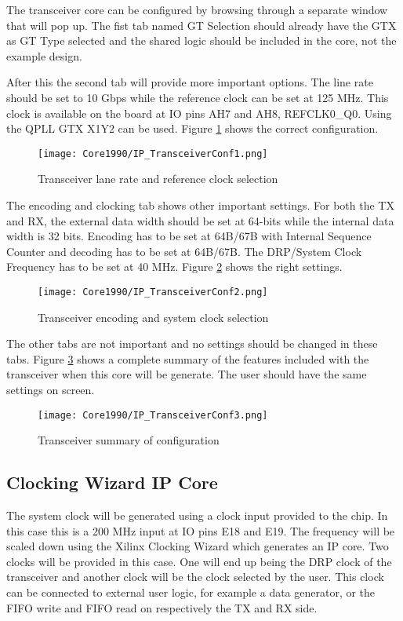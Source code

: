 	The transceiver core can be configured by browsing through a separate window that will pop up. The fist tab named GT Selection should already have the GTX as GT Type selected and the shared logic should be included in the core, not the example design.
	
	After this the second tab will provide more important options. The line rate should be set to 10 Gbps while the reference clock can be set at 125 MHz. This clock is available on the board at IO pins AH7 and AH8, REFCLK0\_Q0. Using the QPLL GTX X1Y2 can be used. Figure \ref{fig:IP_TransceiverConf1} shows the correct configuration.
	
	\begin{figure}[H]
		\centering
		\texttt{[image: Core1990/IP\_TransceiverConf1.png]}	
		\caption{Transceiver lane rate and reference clock selection}
		\label{fig:IP_TransceiverConf1}
	\end{figure} 
	
	The encoding and clocking tab shows other important settings. For both the TX and RX, the external data width should be set at 64-bits while the internal data width is 32 bits. Encoding has to be set at 64B/67B with Internal Sequence Counter and decoding has to be set at 64B/67B. The DRP/System Clock Frequency has to be set at 40 MHz. Figure \ref{fig:IP_TransceiverConf2} shows the right settings.
	
	\begin{figure}[H]
		\centering
		\texttt{[image: Core1990/IP\_TransceiverConf2.png]}	
		\caption{Transceiver encoding and system clock selection}
		\label{fig:IP_TransceiverConf2}
	\end{figure} 
	
	The other tabs are not important and no settings should be changed in these tabs. Figure \ref{fig:IP_TransceiverConf3} shows a complete summary of the features included with the transceiver when this core will be generate. The user should have the same settings on screen. 
	
	\begin{figure}[H]
		\centering
		\texttt{[image: Core1990/IP\_TransceiverConf3.png]}	
		\caption{Transceiver summary of configuration}
		\label{fig:IP_TransceiverConf3}
	\end{figure} 

\newpage

\subsection{Clocking Wizard IP Core}
	The system clock will be generated using a clock input provided to the chip. In this case this is a 200 MHz input at IO pins E18 and E19. The frequency will be scaled down using the Xilinx Clocking Wizard which generates an IP core. Two clocks will be provided in this case. One will end up being the DRP clock of the transceiver and another clock will be the clock selected by the user. This clock can be connected to external user logic, for example a data generator, or the FIFO write and FIFO read on respectively the TX and RX side.
	 
